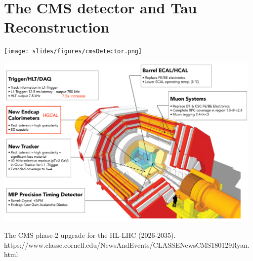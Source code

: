 \section{The CMS detector and Tau Reconstruction}
\begin{frame}{}
    \begin{center}
        \texttt{[image: slides/figures/cmsDetector.png]}
    \end{center}
\end{frame}

\begin{frame}{}
    \begin{center}
        \includegraphics[width=0.98\textwidth]{slides/figures/CMS_NSF_DOE.jpeg}
    \end{center}
    The CMS phase-2 upgrade for the HL-LHC (2026-2035). \tiny{ https://www.classe.cornell.edu/NewsAndEvents/CLASSENewsCMS180129Ryan.html}
\end{frame}






        
